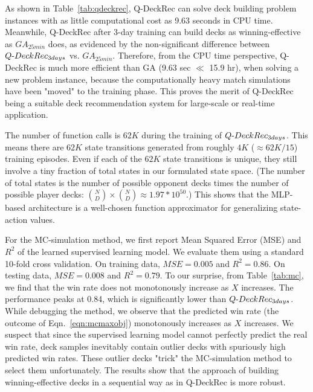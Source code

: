 
As shown in Table~\ref{tab:qdeckrec}, Q-DeckRec can solve deck building problem instances with as little computational cost as 9.63 seconds in CPU time. Meanwhile, Q-DeckRec after 3-day training can build decks as winning-effective as $GA_{25min}$ does, as evidenced by the non-significant difference between $Q\textnormal{-}DeckRec_{ 3days}$ vs. $GA_{25min}$. Therefore, from the CPU time perspective, Q-DeckRec is much more efficient than GA ({9.63 sec $\ll$ 15.9 hr}), when solving a new problem instance, because the computationally heavy match simulations have been "moved" to the training phase. This proves the merit of Q-DeckRec being a suitable deck recommendation system for large-scale or real-time application. 

The number of function calls is $62K$ during the training of $Q\textnormal{-}DeckRec_{3days}$. This means there are $62K$ state transitions generated from roughly $4K$ ($\approx 62K/15$) training episodes. Even if each of the $62K$ state transitions is unique, they still involve a tiny fraction of total states in our formulated state space. (The number of total states is the number of possible opponent decks times the number of possible player decks: ${N\choose D} \times {N\choose D} \approx 1.97 * 10^{50}$.) This shows that the MLP-based architecture is a well-chosen function approximator for generalizing state-action values.    


For the MC-simulation method, we first report Mean Squared Error (MSE) and $R^2$ of the learned supervised learning model. We evaluate them using a standard 10-fold cross validation. On training data, $MSE=0.005$ and $R^2=0.86$. On testing data, $MSE=0.008$ and $R^2=0.79$. To our surprise, from Table~\ref{tab:mc}, we find that the win rate does not monotonously increase as $X$ increases. The performance peaks at 0.84, which is significantly lower than $Q\textnormal{-}DeckRec_{3days}$. While debugging the method, we observe that the predicted win rate (the outcome of Eqn.~\ref{eqn:mcmaxobj}) monotonously increases as $X$ increases. We suspect that since the supervised learning model cannot perfectly predict the real win rate, deck samples inevitably contain outlier decks with spuriously high predicted win rates. These outlier decks "trick" the MC-simulation method to select them unfortunately. The results show that the approach of building winning-effective decks in a sequential way as in Q-DeckRec is more robust.


